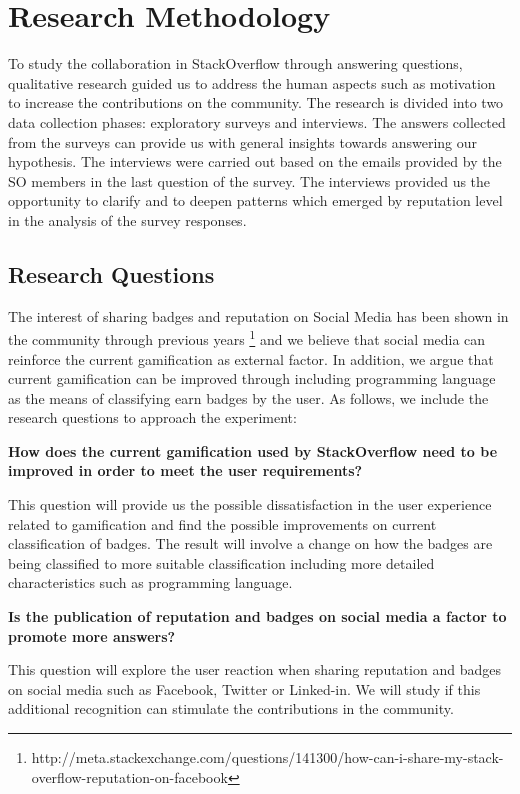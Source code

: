 \documentclass{sigchi}
\begin{document}
\section{Research Methodology}
To study the collaboration in StackOverflow through answering questions, qualitative research \cite{Easterbrook} guided us to address the human aspects such as motivation to increase the contributions on the community. The research is divided into two data collection phases: exploratory surveys and interviews. The answers collected from the surveys can provide us with general insights towards answering our hypothesis. The interviews were carried out based on the emails provided by the SO members in the last question of the survey. The interviews provided us the opportunity to clarify and to deepen patterns which emerged by reputation level in the analysis of the survey responses.

\subsection{Research Questions}
The interest of sharing badges and reputation on Social Media has been shown in the community through previous years \footnote{http://meta.stackexchange.com/questions/141300/how-can-i-share-my-stack-overflow-reputation-on-facebook} and we believe that social media can reinforce the current gamification as external factor. In addition, we argue that current gamification can be improved through including programming language as the means of classifying earn badges by the user. As follows, we include the research questions to approach the experiment:

\textbf{How does the current gamification used by StackOverflow need to be improved in order to meet the user requirements?}

This question will provide us the possible dissatisfaction in the user experience related to gamification and find the possible improvements on current classification of badges. The result will involve a change on how the badges are being classified to more suitable classification including more detailed characteristics such as programming language.

\textbf{Is the publication of reputation and badges on social media a
factor to promote more answers?}

This question will explore the user reaction when sharing reputation and badges on social media such as Facebook, Twitter or Linked-in. We will study if this additional recognition can stimulate the contributions in the community.
\end{document}
